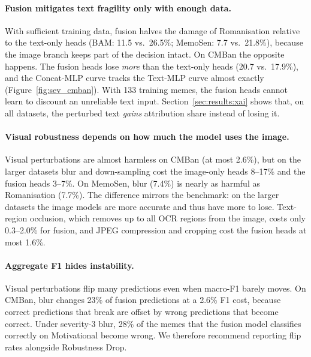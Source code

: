 \paragraph{Fusion mitigates text fragility only with enough data.} With sufficient training data, fusion halves the
damage of Romanisation relative to the text-only heads (BAM: 11.5 vs.\ 26.5\%; MemoSen: 7.7 vs.\ 21.8\%), because the
image branch keeps part of the decision intact. On CMBan the opposite happens. The fusion heads lose \emph{more}
than the text-only heads (20.7 vs.\ 17.9\%), and the Concat-MLP curve tracks the Text-MLP curve almost exactly
(Figure~\ref{fig:sev_cmban}). With 133 training memes, the fusion heads cannot learn to discount an unreliable
text input. Section~\ref{sec:results:xai} shows that, on all datasets, the perturbed text \emph{gains}
attribution share instead of losing it.

\paragraph{Visual robustness depends on how much the model uses the image.} Visual perturbations are almost harmless
on CMBan (at most 2.6\%), but on the larger datasets blur and down-sampling cost the image-only heads 8--17\% and
the fusion heads 3--7\%. On MemoSen, blur (7.4\%) is nearly as harmful as Romanisation (7.7\%). The difference
mirrors the benchmark: on the larger datasets the image models are more accurate and thus have more to lose.
Text-region occlusion, which removes up to all OCR regions from the image, costs only 0.3--2.0\% for fusion, and
JPEG compression and cropping cost the fusion heads at most 1.6\%.

\paragraph{Aggregate F1 hides instability.} Visual perturbations flip many predictions even when macro-F1 barely
moves. On CMBan, blur changes 23\% of fusion predictions at a 2.6\% F1 cost, because correct predictions that break
are offset by wrong predictions that become correct. Under severity-3 blur, 28\% of the memes that the fusion model
classifies correctly on Motivational become wrong. We therefore recommend reporting flip rates alongside Robustness
Drop.

